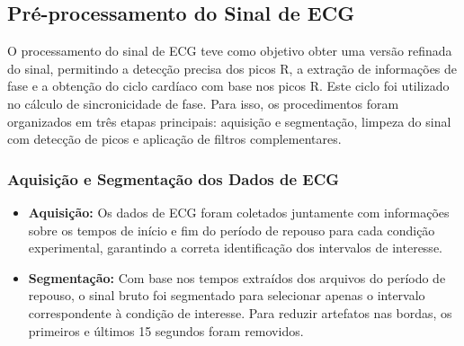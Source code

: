 \subsection{Pré-processamento do Sinal de ECG}
\label{subsec:preprocess_ecg}

O processamento do sinal de ECG teve como objetivo obter uma versão refinada do sinal, permitindo a detecção precisa dos picos R, a extração de informações de fase e a obtenção do ciclo cardíaco com base nos picos R. Este ciclo foi utilizado no cálculo de sincronicidade de fase. Para isso, os procedimentos foram organizados em três etapas principais: aquisição e segmentação, limpeza do sinal com detecção de picos e aplicação de filtros complementares.

\subsubsection{Aquisição e Segmentação dos Dados de ECG}
\begin{itemize}
    \item \textbf{Aquisição:} Os dados de ECG foram coletados juntamente com informações sobre os tempos de início e fim do período de repouso para cada condição experimental, garantindo a correta identificação dos intervalos de interesse.
    \item \textbf{Segmentação:} Com base nos tempos extraídos dos arquivos do período de repouso, o sinal bruto foi segmentado para selecionar apenas o intervalo correspondente à condição de interesse. Para reduzir artefatos nas bordas, os primeiros e últimos 15 segundos foram removidos.
\end{itemize}

